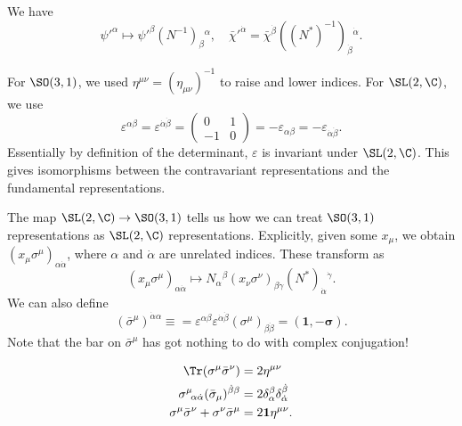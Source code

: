 \documentclass[a4paper]{article}
\begin{document}
\begin{defi}
  We have
  \[
    \psi'^\alpha \mapsto \psi'^\beta  (N^{-1})_\beta\!^\alpha,\quad \bar{\chi}'^{\dot{\alpha}} = \bar{\chi}^{\dot{\beta}} ((N^*)^{-1})_{\dot{\beta}}\!^{\dot{\alpha}}.
  \]
\end{defi}

For $\SO(3, 1)$, we used $\eta^{\mu\nu} = (\eta_{\mu\nu})^{-1}$ to raise and lower indices. For $\SL(2, \C)$, we use
\[
  \varepsilon^{\alpha\beta} = \varepsilon^{\dot{\alpha}\dot{\beta}} =
  \begin{pmatrix}
    0 & 1\\
    -1 & 0
  \end{pmatrix} = - \varepsilon_{\alpha\beta} = - \varepsilon_{\dot{\alpha}\dot{\beta}}.
\]
Essentially by definition of the determinant, $\varepsilon$ is invariant under $\SL(2, \C)$. This gives isomorphisms between the contravariant representations and the fundamental representations.

The map $\SL(2, \C) \to \SO(3, 1)$ tells us how we can treat $\SO(3, 1)$ representations as $\SL(2, \C)$ representations. Explicitly, given some $x_\mu$, we obtain $(x_\mu \sigma^\mu)_{\alpha \dot{\alpha}}$, where $\alpha$ and $\dot{\alpha}$ are unrelated indices. These transform as
\[
  (x_\mu \sigma^\mu)_{\alpha \dot{\alpha}} \mapsto N_\alpha\!^\beta (x_\nu \sigma^\nu)_{\beta \dot{\gamma}} (N^*)_{\dot{\alpha}}\!^{\dot{\gamma}}.
\]
We can also define
\[
  (\bar{\sigma}^\mu)^{\dot{\alpha} \alpha} \equiv = \varepsilon^{\alpha \beta} \varepsilon^{\dot{\alpha} \dot{\beta}} (\sigma^\mu)_{\beta \dot{\beta}} = (\mathbf{1}, -\boldsymbol\sigma).
\]
Note that the bar on $\bar{\sigma}^\mu$ has got nothing to do with complex conjugation!
\begin{ex}\leavevmode
  \begin{align*}
    \Tr(\sigma^\mu \bar{\sigma}^\nu) &= 2\eta^{\mu\nu}\\
    \sigma^\mu\!_{\alpha \dot{\alpha}} (\bar{\sigma}_\mu)^{\dot{\beta} \beta} &= 2 \delta_{\alpha}^\beta \delta_{\dot{\alpha}}^{\dot{\beta}}\\
    \sigma^\mu \bar{\sigma}^\nu + \sigma^\nu \bar{\sigma}^\mu &= 2\mathbf{1} \eta^{\mu\nu}.
  \end{align*}
\end{ex}
\end{document}

